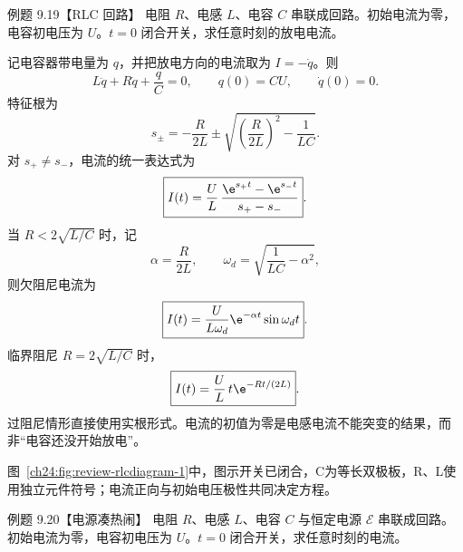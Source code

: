 \begin{origexamplebox}{例题 9.19【RLC 回路】}
电阻 $R$、电感 $L$、电容 $C$ 串联成回路。初始电流为零，电容初电压为 $U$。$t=0$ 闭合开关，求任意时刻的放电电流。
\par\noindent\begin{minipage}{\linewidth}
\label{ch24:fig:review-rlcdiagram-1}
\end{minipage}\par\medskip
\end{origexamplebox}

\begin{xesolution}
记电容器带电量为 $q$，并把放电方向的电流取为 $I=-\dot q$。则
\begin{equation}
  L\ddot q+R\dot q+\frac qC=0,
  \qquad q(0)=CU,
  \qquad \dot q(0)=0.
\end{equation}
特征根为
\begin{equation}
  s_\pm=-\frac{R}{2L}\pm
  \sqrt{\left(\frac{R}{2L}\right)^2-\frac1{LC}}.
\end{equation}
对 $s_+\ne s_-$，电流的统一表达式为
\begin{equation}
  \boxed{I(t)=\frac UL\,
  \frac{\e^{s_+t}-\e^{s_-t}}{s_+-s_-}}.
\end{equation}
当 $R<2\sqrt{L/C}$ 时，记
\begin{equation}
  \alpha=\frac{R}{2L},
  \qquad
  \omega_d=\sqrt{\frac1{LC}-\alpha^2},
\end{equation}
则欠阻尼电流为
\begin{equation}
  \boxed{I(t)=\frac{U}{L\omega_d}\e^{-\alpha t}\sin\omega_dt}.
\end{equation}
临界阻尼 $R=2\sqrt{L/C}$ 时，
\begin{equation}
  \boxed{I(t)=\frac{U}{L}\,t\e^{-Rt/(2L)}}.
\end{equation}
过阻尼情形直接使用实根形式。电流的初值为零是电感电流不能突变的结果，而非“电容还没开始放电”。

图~\ref{ch24:fig:review-rlcdiagram-1}中，图示开关已闭合，C为等长双极板，R、L使用独立元件符号；电流正向与初始电压极性共同决定方程。

\end{xesolution}

\begin{origexamplebox}{例题 9.20【电源凑热闹】}
电阻 $R$、电感 $L$、电容 $C$ 与恒定电源 $\mathcal E$ 串联成回路。初始电流为零，电容初电压为 $U$。$t=0$ 闭合开关，求任意时刻的电流。
\par\noindent\begin{minipage}{\linewidth}
\label{ch24:fig:review-rlcdiagram-2}
\end{minipage}\par\medskip
\end{origexamplebox}

